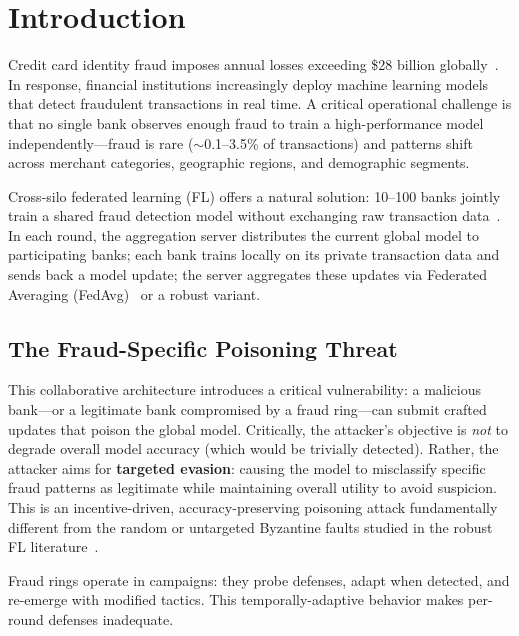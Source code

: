 \documentclass[10pt,journal]{IEEEtran}
\begin{document}
\section{Introduction}
\label{sec:intro}

Credit card identity fraud imposes annual losses exceeding \$28 billion globally~\cite{nilson2023}. In response, financial institutions increasingly deploy machine learning models that detect fraudulent transactions in real time. A critical operational challenge is that no single bank observes enough fraud to train a high-performance model independently---fraud is rare ($\sim$0.1--3.5\% of transactions) and patterns shift across merchant categories, geographic regions, and demographic segments.

Cross-silo federated learning (FL) offers a natural solution: 10--100 banks jointly train a shared fraud detection model without exchanging raw transaction data~\cite{yang2019,kairouz2021}. In each round, the aggregation server distributes the current global model to participating banks; each bank trains locally on its private transaction data and sends back a model update; the server aggregates these updates via Federated Averaging (FedAvg)~\cite{mcmahan2017} or a robust variant.

\subsection{The Fraud-Specific Poisoning Threat}

This collaborative architecture introduces a critical vulnerability: a malicious bank---or a legitimate bank compromised by a fraud ring---can submit crafted updates that poison the global model. Critically, the attacker's objective is \emph{not} to degrade overall model accuracy (which would be trivially detected). Rather, the attacker aims for \textbf{targeted evasion}: causing the model to misclassify specific fraud patterns as legitimate while maintaining overall utility to avoid suspicion. This is an incentive-driven, accuracy-preserving poisoning attack fundamentally different from the random or untargeted Byzantine faults studied in the robust FL literature~\cite{lamport1982,alistarh2018,allen-zhu2021}.

Fraud rings operate in campaigns: they probe defenses, adapt when detected, and re-emerge with modified tactics. This temporally-adaptive behavior makes per-round defenses inadequate.
\end{document}
